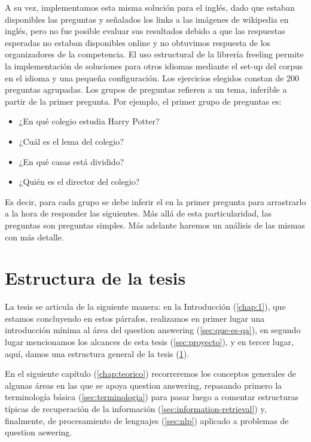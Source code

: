 A su vez, implementamos esta misma solución para el inglés, dado que estaban disponibles las preguntas y señalados los links a las imágenes de wikipedia en inglés, pero no fue posible evaluar sus resultados debido a que las respuestas esperadas no estaban disponibles online y no obtuvimos respuesta de los organizadores de la competencia. El uso estructural de la librería freeling permite la implementación de soluciones para otros idiomas mediante el set-up del corpus en el idioma y una pequeña configuración.
Los ejercicios elegidos constan de 200 preguntas agrupadas. Los grupos de preguntas refieren a un tema, inferible a partir de la primer pregunta.
Por ejemplo, el primer grupo de preguntas es:
\begin{itemize}
\item ¿En qué colegio estudia Harry Potter?
\item ¿Cuál es el lema del colegio?
\item ¿En qué casas está dividido?
\item ¿Quién es el director del colegio?
\end{itemize}
Es decir, para cada grupo se debe inferir el  en la primer pregunta para arrastrarlo a la hora de responder las siguientes. Más allá de esta particularidad, las preguntas son preguntas simples. Más adelante haremos un análisis de las mismas con más detalle.



\section{Estructura de la tesis}
\label{sec:estructura}

La tesis se articula de la siguiente manera: en la Introducción (\ref{chap:1}), que estamos concluyendo en estos párrafos, realizamos en primer lugar una introducción mínima al área del question answering (\ref{sec:que-es-qa}), en segundo lugar mencionamos los alcances de esta tesis (\ref{sec:proyecto}), y en tercer lugar, aquí, damos una estructura general de la tesis (\ref{sec:estructura}).

En el siguiente capítulo (\ref{chap:teorico}) recorreremos los conceptos generales de algunas áreas en las que se apoya question answering, repasando primero la terminología básica (\ref{sec:terminologia}) para pasar luego a comentar estructuras típicas de recuperación de la información (\ref{sec:information-retrieval}) y, finalmente, de procesamiento de lenguajes (\ref{sec:nlp}) aplicado a problemas de question aswering.

